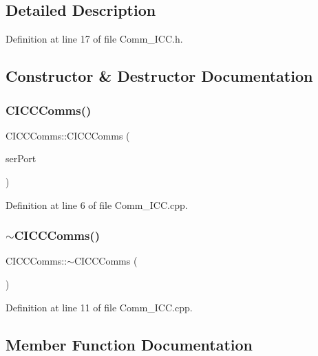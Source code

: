 \subsection{Detailed Description}


Definition at line 17 of file Comm\+\_\+\+I\+C\+C.\+h.



\subsection{Constructor \& Destructor Documentation}
\mbox{\label{class_c_i_c_c_comms_af2cb9bb6ab473bc5ea2b4aa2f98084ff}} 
\subsubsection{\texorpdfstring{CICCComms()}{CICCComms()}}
{\footnotesize\ttfamily C\+I\+C\+C\+Comms\+::\+C\+I\+C\+C\+Comms (\begin{DoxyParamCaption}\item[{\mbox{\hyperlink{class_c_serial}{C\+Serial}} \&}]{ser\+Port }\end{DoxyParamCaption})}



Definition at line 6 of file Comm\+\_\+\+I\+C\+C.\+cpp.

\mbox{\label{class_c_i_c_c_comms_a951ae11fd2024309bd4ecf67981287e7}} 
\subsubsection{\texorpdfstring{$\sim$CICCComms()}{~CICCComms()}}
{\footnotesize\ttfamily C\+I\+C\+C\+Comms\+::$\sim$\+C\+I\+C\+C\+Comms (\begin{DoxyParamCaption}{ }\end{DoxyParamCaption})}



Definition at line 11 of file Comm\+\_\+\+I\+C\+C.\+cpp.



\subsection{Member Function Documentation}
\mbox{\label{class_c_i_c_c_comms_ab925dd7ff82f30ccd9f770ab2281b3ab}} 
